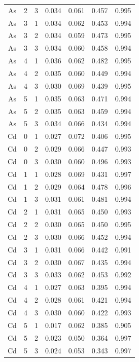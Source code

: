 \documentclass[ms, hidelinks]{uncgdissertationexp}
\theoremstyle{plain}
\theoremstyle{definition}
\theoremstyle{remark}
\begin{document}
\begin{longtable}{ccccccc}
\rowcolor{gray!6}  As & 2 & 3 & 0.034 & 0.061 & 0.457 & 0.995\\
As & 3 & 1 & 0.034 & 0.062 & 0.453 & 0.994\\
\rowcolor{gray!6}  As & 3 & 2 & 0.034 & 0.059 & 0.473 & 0.995\\
As & 3 & 3 & 0.034 & 0.060 & 0.458 & 0.994\\
\rowcolor{gray!6}  As & 4 & 1 & 0.036 & 0.062 & 0.482 & 0.995\\
As & 4 & 2 & 0.035 & 0.060 & 0.449 & 0.994\\
\rowcolor{gray!6}  As & 4 & 3 & 0.030 & 0.069 & 0.439 & 0.995\\
As & 5 & 1 & 0.035 & 0.063 & 0.471 & 0.994\\
\rowcolor{gray!6}  As & 5 & 2 & 0.035 & 0.063 & 0.459 & 0.994\\
As & 5 & 3 & 0.034 & 0.066 & 0.434 & 0.994\\
\rowcolor{gray!6}  Cd & 0 & 1 & 0.027 & 0.072 & 0.406 & 0.995\\
Cd & 0 & 2 & 0.029 & 0.066 & 0.447 & 0.993\\
\rowcolor{gray!6}  Cd & 0 & 3 & 0.030 & 0.060 & 0.496 & 0.993\\
Cd & 1 & 1 & 0.028 & 0.069 & 0.431 & 0.997\\
\rowcolor{gray!6}  Cd & 1 & 2 & 0.029 & 0.064 & 0.478 & 0.996\\
Cd & 1 & 3 & 0.031 & 0.061 & 0.481 & 0.994\\
\rowcolor{gray!6}  Cd & 2 & 1 & 0.031 & 0.065 & 0.450 & 0.993\\
Cd & 2 & 2 & 0.030 & 0.065 & 0.450 & 0.995\\
\rowcolor{gray!6}  Cd & 2 & 3 & 0.030 & 0.066 & 0.452 & 0.994\\
Cd & 3 & 1 & 0.031 & 0.066 & 0.442 & 0.991\\
\rowcolor{gray!6}  Cd & 3 & 2 & 0.030 & 0.067 & 0.435 & 0.994\\
Cd & 3 & 3 & 0.033 & 0.062 & 0.453 & 0.992\\
\rowcolor{gray!6}  Cd & 4 & 1 & 0.027 & 0.063 & 0.395 & 0.994\\
Cd & 4 & 2 & 0.028 & 0.061 & 0.421 & 0.994\\
\rowcolor{gray!6}  Cd & 4 & 3 & 0.030 & 0.060 & 0.422 & 0.993\\
Cd & 5 & 1 & 0.017 & 0.062 & 0.385 & 0.905\\
\rowcolor{gray!6}  Cd & 5 & 2 & 0.023 & 0.050 & 0.364 & 0.997\\
Cd & 5 & 3 & 0.024 & 0.053 & 0.343 & 0.997\\

\end{longtable}
\end{document}
